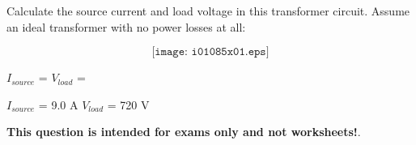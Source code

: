 

Calculate the source current and load voltage in this transformer circuit.  Assume an ideal transformer with no power losses at all:

$$\texttt{[image: i01085x01.eps]}$$

$I_{source}$ = \hskip 80pt $V_{load}$ =

\vskip 10pt







$I_{source}$ = 9.0 A \hskip 80pt $V_{load}$ = 720 V







{\bf This question is intended for exams only and not worksheets!}.



